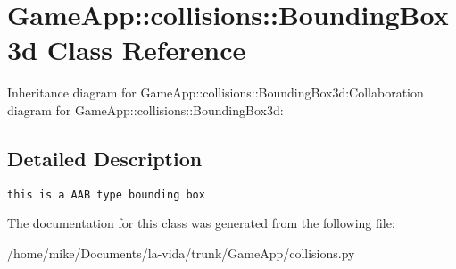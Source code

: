 \hypertarget{classGameApp_1_1collisions_1_1BoundingBox3d}{
\section{GameApp::collisions::BoundingBox3d Class Reference}
\label{classGameApp_1_1collisions_1_1BoundingBox3d}
}
Inheritance diagram for GameApp::collisions::BoundingBox3d:Collaboration diagram for GameApp::collisions::BoundingBox3d:

\subsection{Detailed Description}


\footnotesize\begin{verbatim}this is a AAB type bounding box \end{verbatim}
\normalsize
 

The documentation for this class was generated from the following file:\begin{CompactItemize}
\item 
/home/mike/Documents/la-vida/trunk/GameApp/collisions.py\end{CompactItemize}
